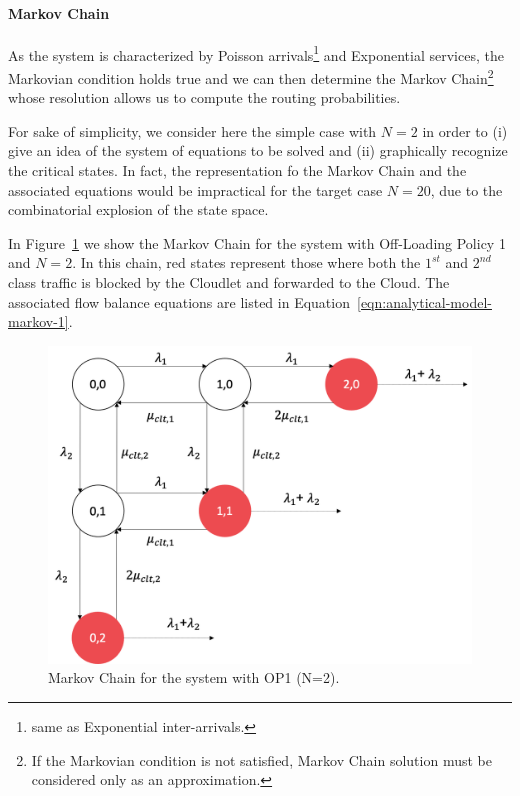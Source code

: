 \paragraph{Markov Chain}
As the system is characterized by Poisson arrivals\footnote{same as Exponential inter-arrivals.} and Exponential services, the Markovian condition holds true and we can then determine the Markov Chain\footnote{If the Markovian condition is not satisfied, Markov Chain solution must be considered only as an approximation.} whose resolution allows us to compute the routing probabilities.

For sake of simplicity, we consider here the simple case with $N=2$ in order to (i) give an idea of the system of equations to be solved and (ii) graphically recognize the critical states. 
In fact, the representation fo the Markov Chain and the associated equations would be impractical for the target case $N=20$, due to the combinatorial explosion of the state space.

In Figure~\ref{fig:analytical-model-markov-1} we show the Markov Chain for the system with Off-Loading Policy 1 and $N=2$. 
In this chain, red states represent those where both the $1^{st}$ and $2^{nd}$ class traffic is blocked by the Cloudlet and forwarded to the Cloud.
The associated flow balance equations are listed in Equation~\ref{eqn:analytical-model-markov-1}.

\begin{figure}
	\includegraphics[width=\columnwidth]{fig/analytical-model-markov-1}
	\caption{Markov Chain for the system with OP1 (N=2).}
	\label{fig:analytical-model-markov-1}
\end{figure}

